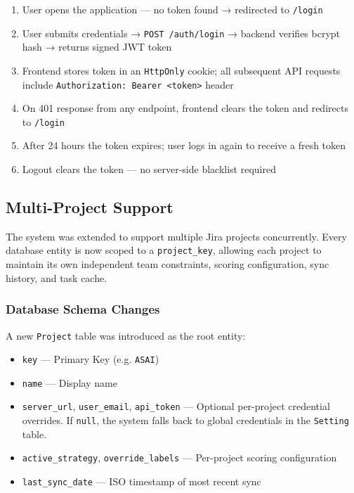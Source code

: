 \documentclass[12pt, a4paper]{article}
\begin{document}
\begin{enumerate}
    \item User opens the application — no token found → redirected to \texttt{/login}
    \item User submits credentials → \texttt{POST /auth/login} → backend verifies bcrypt hash → returns signed JWT token
    \item Frontend stores token in an \texttt{HttpOnly} cookie; all subsequent API requests include \texttt{Authorization: Bearer <token>} header
    \item On 401 response from any endpoint, frontend clears the token and redirects to \texttt{/login}
    \item After 24 hours the token expires; user logs in again to receive a fresh token
    \item Logout clears the token — no server-side blacklist required
\end{enumerate}


\subsection{Multi-Project Support}

The system was extended to support multiple Jira projects concurrently. Every database entity is now scoped to a \texttt{project\_key}, allowing each project to maintain its own independent team constraints, scoring configuration, sync history, and task cache.

\subsubsection{Database Schema Changes}

A new \texttt{Project} table was introduced as the root entity:

\begin{itemize}
    \item \texttt{key} — Primary Key (e.g. \texttt{ASAI})
    \item \texttt{name} — Display name
    \item \texttt{server\_url}, \texttt{user\_email}, \texttt{api\_token} — Optional per-project credential overrides. If \texttt{null}, the system falls back to global credentials in the \texttt{Setting} table.
    \item \texttt{active\_strategy}, \texttt{override\_labels} — Per-project scoring configuration
    \item \texttt{last\_sync\_date} — ISO timestamp of most recent sync
\end{itemize}
\end{document}
